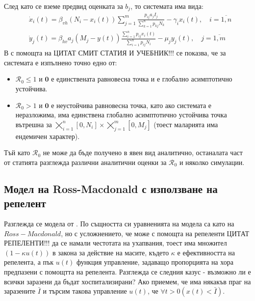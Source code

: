 След като се вземе предвид оценката за $b_j$, то системата има вида:
\begin{equation}
  \label{eq:MigrationProblem}
  \begin{split}
    &\dot{x}_i(t) = \beta_{vh} (N_i - x_i(t)) \sum_{j=1}^{m} \frac{p_{ij} a_j I_j}{\sum_{k=1}^n p_{kj} N_k} - \gamma_i x_i(t), \quad i=\overline{1, n} \\
    &\dot{y}_j(t) = \beta_{hv} a_j (M_j - y(t)) \frac{\sum_{i=1}^n p_{ij} x_i(t)}{\sum_{i=1}^n p_{ij} N_i} - \mu_j y_j(t), \quad j=\overline{1, m}
  \end{split}
  \end{equation}
В \cite{Bichara2016} с помощта на  \color{Red} ЦИТАТ СМИТ СТАТИЯ И УЧЕБНИК!!!
\color{Black} се показва, че за системата е изпълнено точно едно от:
\begin{itemize}
  \item $\mathscr{R}_0 \leq 1$ и $\mathbf{0}$ е единствената равновесна точка и е глобално асимптотично устойчива.
  \item $\mathscr{R}_0 > 1$ и $\mathbf{0}$ е неустойчива равновесна точка, като ако системата е неразложима, има единствена глобално асимптотично устойчива точка вътрешна за $\bigtimes_{i=1}^{n} [0, N_i] \times \bigtimes_{j=1}^{m} [0, M_j]$ (тоест маларията има ендемичен характер).
\end{itemize}

Тъй като $\mathscr{R}_0$ не може да бъде получено в явен вид аналитично, останалата част от статията \cite{Bichara2016} разглежда различни аналитични оценки за $\mathscr{R}_0$ и няколко симулации.

\subsection{Модел на Ross-Macdonald с използване на репелент}
Разглежда се модела от \cite{Rashkov2019}. По същността си уравненията на модела са като на $Ross-Macdonald$, но с усложнението, че може с помощта на репеленти \color{Red} ЦИТАТ РЕПЕЛЕНТИ!!!
\color{Black} да се намали честотата на ухапвания, тоест има множител $(1 - \kappa u(t))$ в закона за действие на масите, където $\kappa$ е ефективността на репелента, а пък $u(t)$ функция управление, задаващо пропорцията на хора предпазени с помощтта на репелента.
Разглежда се следния казус - възможно ли е всички заразени да бъдат хоспитализирани? Ако приемем, че има някакъв праг на заразените $\bar{I}$ и търсим такова управление $u(t)$, че $\forall t>0 (x(t) < \bar{I})$.

